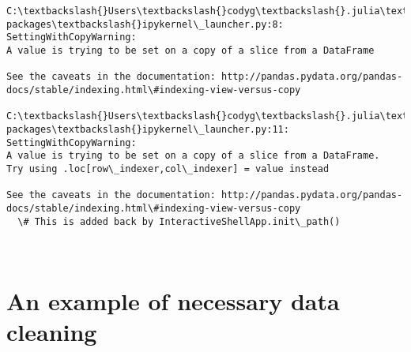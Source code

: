 \documentclass[11pt]{article}
\begin{document}
    \begin{Verbatim}[commandchars=\\\{\}]
C:\textbackslash{}Users\textbackslash{}codyg\textbackslash{}.julia\textbackslash{}v0.6\textbackslash{}Conda\textbackslash{}deps\textbackslash{}usr\textbackslash{}lib\textbackslash{}site-packages\textbackslash{}ipykernel\_launcher.py:8: SettingWithCopyWarning: 
A value is trying to be set on a copy of a slice from a DataFrame

See the caveats in the documentation: http://pandas.pydata.org/pandas-docs/stable/indexing.html\#indexing-view-versus-copy
  
C:\textbackslash{}Users\textbackslash{}codyg\textbackslash{}.julia\textbackslash{}v0.6\textbackslash{}Conda\textbackslash{}deps\textbackslash{}usr\textbackslash{}lib\textbackslash{}site-packages\textbackslash{}ipykernel\_launcher.py:11: SettingWithCopyWarning: 
A value is trying to be set on a copy of a slice from a DataFrame.
Try using .loc[row\_indexer,col\_indexer] = value instead

See the caveats in the documentation: http://pandas.pydata.org/pandas-docs/stable/indexing.html\#indexing-view-versus-copy
  \# This is added back by InteractiveShellApp.init\_path()

    \end{Verbatim}

    \begin{center}
    \end{center}
    { \hspace*{\fill} \\}
    
    \section{An example of necessary data
cleaning}\label{an-example-of-necessary-data-cleaning}
\end{document}
